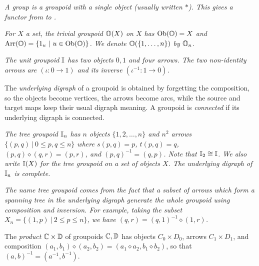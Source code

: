 \begin{example} 
\emph{A group is a groupoid with a single object (usually written $*$). 
This gives a functor \Gpd\; from \catGp\; to \catGpd.} 
\end{example}

\begin{example} \label{ex:triv-gpd} 
\emph{For $X$ a set, the \emph{trivial groupoid $\mathbb{O}(X)$ on $X$} 
has $\mathrm{Ob}(\mathbb{O})=X$ and $\mathrm{Arr}(\mathbb{O})=\{1_u ~|~ u \in \mathrm{Ob}(\mathbb{O})\}$. 
We denote $\mathbb{O}(\{1,\ldots,n\})$ by $\mathbb{O}_n$.} 
\end{example}

\begin{example} \label{ex:unit-gpd}  
\emph{The \emph{unit groupoid} $\mathbb{I}$ has two objects $0,1$ and four arrows. 
The two non-identity arrows are $(\iota : 0 \to 1)$ 
and its inverse $(\iota^{-1} : 1 \to 0)$.} 
\end{example}

The \emph{underlying digraph} of a groupoid 
is obtained by forgetting the composition, 
so the objects become vertices, the arrows become arcs, 
while the source and target maps keep their usual digraph meaning. 
A groupoid is \emph{connected} if its underlying digraph is connected. 

\begin{example} \label{ex:tree-groupoid}  
\emph{The \emph{tree groupoid} $\mathbb{I}_n$ has $n$ objects $\{1,2,\ldots,n\}$ 
and $n^2$ arrows $\{(p,q) ~|~ 0 \leqslant p,q \leqslant n\}$ where 
$s(p,q)=p$, $t(p,q)=q$, $(p,q)\diamond(q,r) = (p,r)$, 
and $(p,q)^{-1} = (q,p)$. 
Note that $\mathbb{I}_2 \cong \mathbb{I}$. 
We also write $\mathbb{I}(X)$ for the tree groupoid on a set of objects $X$. 
The underlying digraph of $\mathbb{I}_n$ is complete.} 

\emph{The name tree groupoid comes from the fact that a subset of arrows 
which form a spanning tree in the underlying digraph generate the 
whole groupoid using composition and inversion. 
For example, 
taking the subset $X_n = \{(1,p) ~|~ 2 \leqslant p \leqslant n\}$, 
we have $(q,r) = (q,1)^{-1}\diamond(1,r)$.} 
\end{example}

The \emph{product} $\mathbb{C}\times\mathbb{D}$ of groupoids $\mathbb{C},\mathbb{D}$ 
has objects $C_0 \times D_0$, arrows $C_1 \times D_1$, 
and composition 
$(a_1,b_1)\diamond(a_2,b_2) = (a_1 \diamond a_2, b_1 \diamond b_2)$, 
so that $(a,b)^{-1} = (a^{-1},b^{-1})$. 

